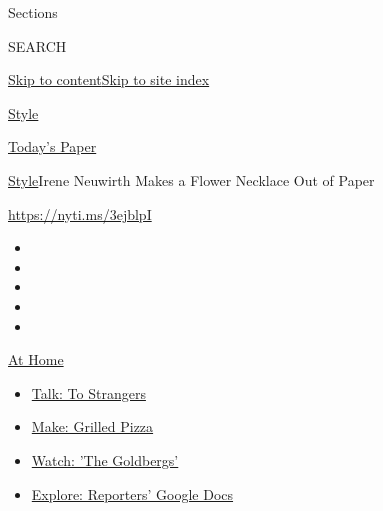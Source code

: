 Sections

SEARCH

\protect\hyperlink{site-content}{Skip to
content}\protect\hyperlink{site-index}{Skip to site index}

\href{https://www.nytimes3xbfgragh.onion/section/style}{Style}

\href{https://myaccount.nytimes3xbfgragh.onion/auth/login?response_type=cookie\&client_id=vi}{}

\href{https://www.nytimes3xbfgragh.onion/section/todayspaper}{Today's
Paper}

\href{/section/style}{Style}\textbar{}Irene Neuwirth Makes a Flower
Necklace Out of Paper

\href{https://nyti.ms/3ejblpI}{https://nyti.ms/3ejblpI}

\begin{itemize}
\item
\item
\item
\item
\item
\end{itemize}

\href{https://www.nytimes3xbfgragh.onion/spotlight/at-home?action=click\&pgtype=Article\&state=default\&region=TOP_BANNER\&context=at_home_menu}{At
Home}

\begin{itemize}
\tightlist
\item
  \href{https://www.nytimes3xbfgragh.onion/2020/08/03/well/family/the-benefits-of-talking-to-strangers.html?action=click\&pgtype=Article\&state=default\&region=TOP_BANNER\&context=at_home_menu}{Talk:
  To Strangers}
\item
  \href{https://www.nytimes3xbfgragh.onion/2020/08/01/at-home/coronavirus-make-pizza-on-a-grill.html?action=click\&pgtype=Article\&state=default\&region=TOP_BANNER\&context=at_home_menu}{Make:
  Grilled Pizza}
\item
  \href{https://www.nytimes3xbfgragh.onion/2020/07/31/arts/television/goldbergs-abc-stream.html?action=click\&pgtype=Article\&state=default\&region=TOP_BANNER\&context=at_home_menu}{Watch:
  'The Goldbergs'}
\item
  \href{https://www.nytimes3xbfgragh.onion/interactive/2020/at-home/even-more-reporters-editors-diaries-lists-recommendations.html?action=click\&pgtype=Article\&state=default\&region=TOP_BANNER\&context=at_home_menu}{Explore:
  Reporters' Google Docs}
\end{itemize}


